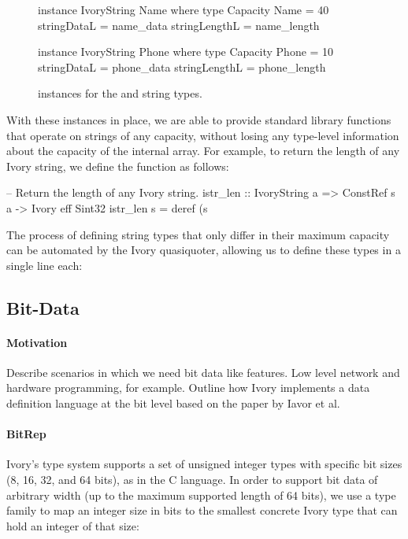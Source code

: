 \begin{figure}[h]
\begin{code}
instance IvoryString Name where
  type Capacity Name = 40
  stringDataL = name_data
  stringLengthL = name_length

instance IvoryString Phone where
  type Capacity Phone = 10
  stringDataL = phone_data
  stringLengthL = phone_length
\end{code}
\caption{ instances for the  and 
string types.}
\label{ivory-string-instances}
\end{figure}

With these instances in place, we are able to provide standard library
functions that operate on strings of any capacity, without losing any
type-level information about the capacity of the internal array. For
example, to return the length of any Ivory string, we define the
 function as follows:

\begin{code}
-- Return the length of any Ivory string.
istr_len :: IvoryString a
         => ConstRef s a -> Ivory eff Sint32
istr_len s = deref (s %
\end{code}

The process of defining string types that only differ
in their maximum capacity can be automated by the Ivory quasiquoter,
allowing us to define these types in a single line each:

\begin{code}
\end{code}

\subsection{Bit-Data}

\paragraph{Motivation}
Describe scenarios in which we need bit data like features. Low level network
and hardware programming, for example. Outline how Ivory implements a data
definition language at the bit level based on the paper by Iavor et al.

\paragraph{BitRep}
Ivory's type system supports a set of unsigned integer types with
specific bit sizes (8, 16, 32, and 64 bits), as in the C language.
In order to support bit data of arbitrary width (up to the maximum
supported length of 64 bits), we use a type family
 to map an integer size in bits to the smallest
concrete Ivory type that can hold an integer of that size:

